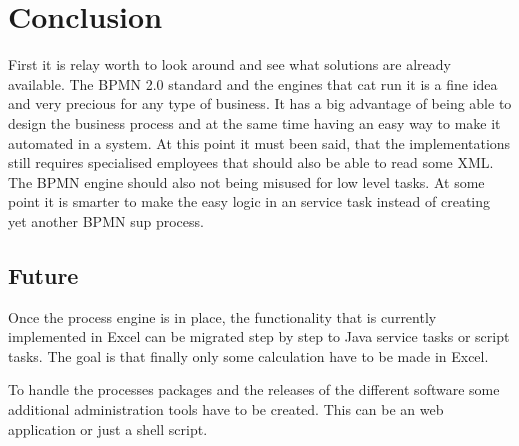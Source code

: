 \documentclass[paper=a4,twoside=false,BCOR=0mm,DIV=calc,fontsize=12pt]{scrartcl}
\begin{document}
\section{Conclusion}
First it is relay worth to look around and see what solutions are already available. The BPMN 2.0 standard and the engines that cat run it is a fine 
idea and very precious for any type of business. It has a big advantage of being able to design the business process and at the same time having an easy way to make it automated in a system.
At this point it must been said, that the implementations still requires specialised employees that should also be able to read some XML. The BPMN engine should also not being misused for low level tasks. At some point it is smarter to make the easy logic in an service task instead of creating yet another BPMN sup process.




\subsection{Future}
Once the process engine is in place, the functionality that is currently implemented in Excel can be migrated step by step to Java service tasks or script tasks. The goal is that finally only some calculation have to be made in Excel.

To handle the processes packages and the releases of the different software some additional administration tools have to be created. This can be an web application or just a shell script.


\newpage
\end{document}
